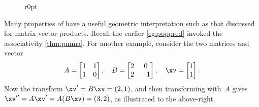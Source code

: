 \begin{figure}r{0pt}
\end{figure}
\begin{example}
Many properties of  have a useful geometric interpretation such as that discussed for matrix-vector products.
Recall the earlier \cref{eg:poppred} invoked the associativity \cref{thm:pmma}.
For another example, consider the two matrices and vector
\begin{equation*}
A=\begin{bmatrix} 1&1\\1&0 \end{bmatrix},\quad
B=\begin{bmatrix} 2&0\\2&-1 \end{bmatrix},\quad
\xv=\begin{bmatrix} 1\\1 \end{bmatrix}.
\end{equation*}
Now the transform \(\xv'=B\xv=(2,1)\), and then transforming with~\(A\) gives \(\xv''=A\xv'=A(B\xv)=(3,2)\), as illustrated to the above-right.


\end{example}

